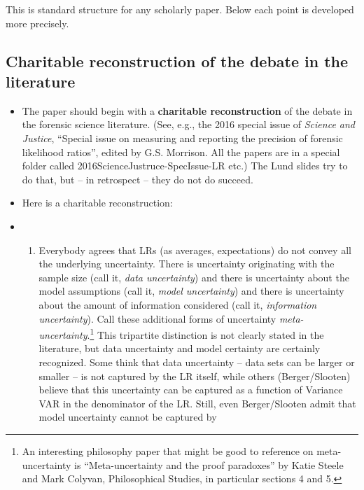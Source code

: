 \documentclass[
  10pt,
  dvipsnames,enabledeprecatedfontcommands]{scrartcl}
\providecommand{\tightlist}{%
  \setlength{\itemsep}{0pt}\setlength{\parskip}{0pt}}
\begin{document}
This is standard structure for any scholarly paper. Below each point is
developed more precisely.

\hypertarget{charitable-reconstruction-of-the-debate-in-the-literature}{%
\subsection{Charitable reconstruction of the debate in the
literature}\label{charitable-reconstruction-of-the-debate-in-the-literature}}

\begin{itemize}
\item
  The paper should begin with a \textbf{charitable reconstruction} of
  the debate in the forensic science literature. (See, e.g., the 2016
  special issue of \emph{Science and Justice}, ``Special issue on
  measuring and reporting the precision of forensic likelihood ratios'',
  edited by G.S. Morrison. All the papers are in a special folder called
  2016ScienceJustruce-SpecIssue-LR etc.) The Lund slides try to do that,
  but -- in retrospect -- they do not do succeed.
\item
  Here is a charitable reconstruction:
\item
  \begin{enumerate}
  \def\labelenumi{(\roman{enumi})}
  \tightlist
  \item
    Everybody agrees that LRs (as averages, expectations) do not convey
    all the underlying uncertainty. There is uncertainty originating
    with the sample size (call it, \emph{data uncertainty}) and there is
    uncertainty about the model assumptions (call it, \emph{model
    uncertainty}) and there is uncertainty about the amount of
    information considered (call it, \emph{information uncertainty}).
    Call these additional forms of uncertainty
    \emph{meta-uncertainty}.\footnote{An interesting philosophy paper
      that might be good to reference on meta-uncertainty is
      ``Meta-uncertainty and the proof paradoxes'' by Katie Steele and
      Mark Colyvan, Philosophical Studies, in particular sections 4 and
      5.} This tripartite distinction is not clearly stated in the
    literature, but data uncertainty and model certainty are certainly
    recognized. Some think that data uncertainty -- data sets can be
    larger or smaller -- is not captured by the LR itself, while others
    (Berger/Slooten) believe that this uncertainty can be captured as a
    function of Variance VAR in the denominator of the LR. Still, even
    Berger/Slooten admit that model uncertainty cannot be captured by

\end{enumerate}
\end{itemize}
\end{document}
